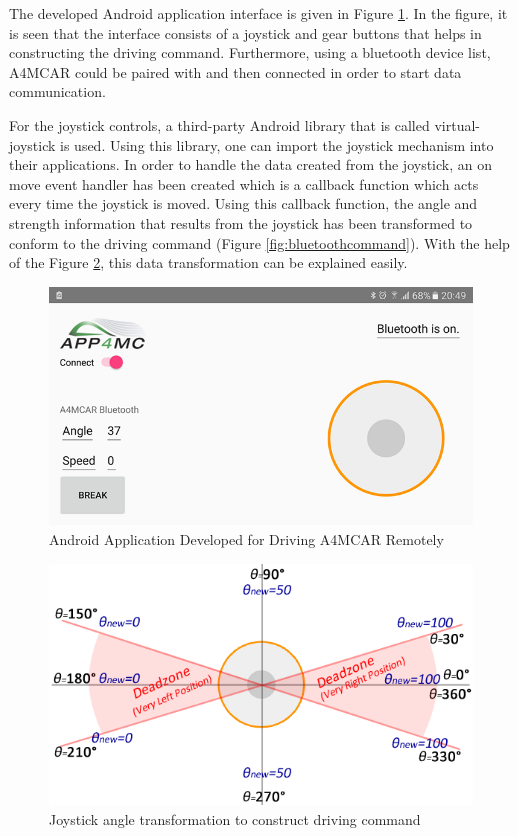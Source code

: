 The developed Android application interface is given in Figure \ref{fig:androidapp}. In the figure, it is seen that the interface consists of a joystick and gear buttons that helps in constructing the driving command. Furthermore, using a bluetooth device list, A4MCAR could be paired with and then connected in order to start data communication.

For the joystick controls, a third-party Android library that is called virtual-joystick \cite{virtualjoystick} is used. Using this library, one can import the joystick mechanism into their applications. In order to handle the data created from the joystick, an on move event handler has been created which is a callback function which acts every time the joystick is moved. Using this callback function, the angle and strength information that results from the joystick has been transformed to conform to the driving command (Figure \ref{fig:bluetoothcommand}). With the help of the Figure \ref{fig:joystickpie}, this data transformation can be explained easily.
\begin{figure}[!ht]
	\centering
	\includegraphics[scale=0.5]{content/images/androidapp.png}
	\caption{Android Application Developed for Driving A4MCAR Remotely}
	\label{fig:androidapp}
\end{figure}
\begin{figure}[!ht]
	\centering
	\includegraphics[scale=0.5]{content/images/joystickpie.png}
	\caption{Joystick angle transformation to construct driving command}
	\label{fig:joystickpie}
\end{figure}

